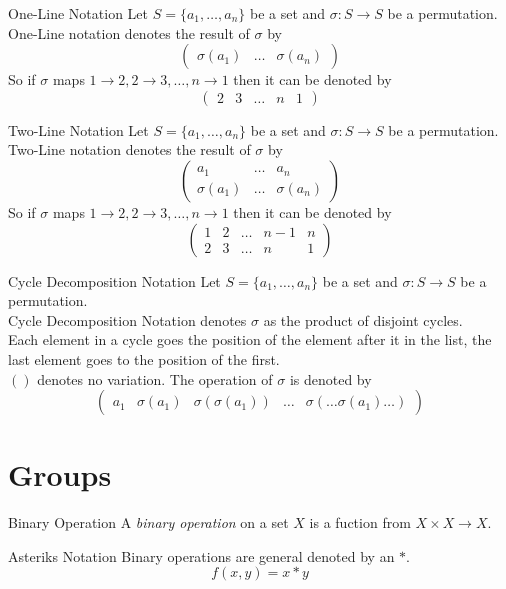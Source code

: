 \documentclass[11pt,a4paper]{article}
\begin{document}
\subtitle{Remark 1.06 - }{One-Line Notation}
Let $S = \{a_1, \dots, a_n\}$ be a set and $\sigma : S \to S$ be a permutation.\\
One-Line notation denotes the result of $\sigma$ by $$\begin{pmatrix} \sigma(a_1) & \dots & \sigma(a_n) \end{pmatrix}$$
So if $\sigma$ maps $1 \to 2, 2 \to 3, \dots, n \to 1$ then it can be denoted by $$\begin{pmatrix} 2  & 3 & \dots & n & 1 \end{pmatrix}$$

\subtitle{Remark 1.07 - }{Two-Line Notation}
Let $S = \{a_1, \dots, a_n\}$ be a set and $\sigma : S \to S$ be a permutation.\\
Two-Line notation denotes the result of $\sigma$ by $$\begin{pmatrix} a_1 & \dots & a_n \\ \sigma(a_1) & \dots & \sigma(a_n) \end{pmatrix}$$
So if $\sigma$ maps $1 \to 2, 2 \to 3, \dots, n \to 1$ then it can be denoted by $$\begin{pmatrix} 1 & 2 & \dots & n-1 & n \\ 2  & 3 & \dots & n & 1 \end{pmatrix}$$

\subtitle{Remark 1.08 - }{Cycle Decomposition Notation}
Let $S = \{a_1, \dots, a_n\}$ be a set and $\sigma : S \to S$ be a permutation.\\
Cycle Decomposition Notation denotes $\sigma$ as the product of disjoint cycles.\\
Each element in a cycle goes the position of the element after it in the list, the last element goes to the position of the first.\\
$()$ denotes no variation. The operation of $\sigma$ is denoted by $$\begin{pmatrix} a_1 & \sigma(a_1) & \sigma(\sigma(a_1)) & \dots & \sigma(\dots\sigma(a_1)\dots)\end{pmatrix}$$

\section{Groups}

\subtitle{Definition 2.01 - }{Binary Operation}
A \textit{binary operation} on a set $X$ is a fuction from $X \times X \to X$.\\

\subtitle{Remark 2.02 - }{Asteriks Notation}
Binary operations are general denoted by an $*$. $$f(x, y) = x*y$$
\end{document}
